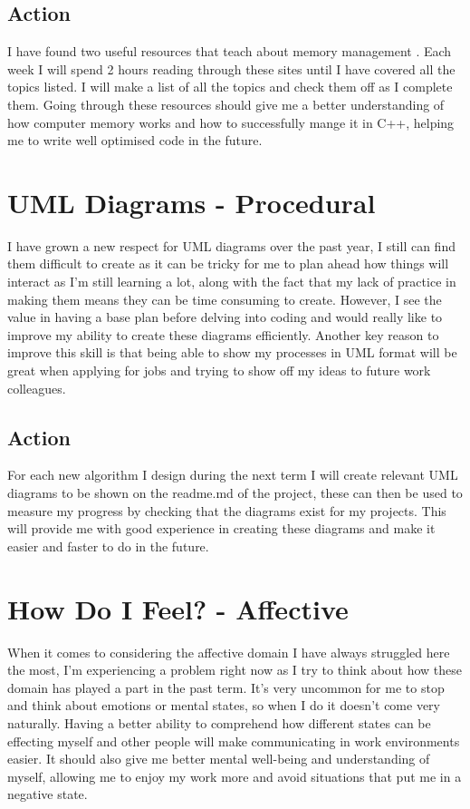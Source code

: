 \documentclass{scrartcl}
\begin{document}
\subsection{Action}
I have found two useful resources that teach about memory management \cite{c++programming/memorymanagement} \cite{whateveryprogrammershouldknowaboutmemory}. Each week I will spend 2 hours reading through these sites until I have covered all the topics listed. I will make a list of all the topics and check them off as I complete them. Going through these resources should give me a better understanding of how computer memory works and how to successfully mange it in C++, helping me to write well optimised code in the future.

\section{UML Diagrams - Procedural}
I have grown a new respect for UML diagrams over the past year, I still can find them difficult to create as it can be tricky for me to plan ahead how things will interact as I'm still learning a lot, along with the fact that my lack of practice in making them means they can be time consuming to create. However, I see the value in having a base plan before delving into coding and would really like to improve my ability to create these diagrams efficiently. Another key reason to improve this skill is that being able to show my processes in UML format will be great when applying for jobs and trying to show off my ideas to future work colleagues.
\subsection{Action}
For each new algorithm I design during the next term I will create relevant UML diagrams to be shown on the readme.md of the project, these can then be used to measure my progress by checking that the diagrams exist for my projects. This will provide me with good experience in creating these diagrams and make it easier and faster to do in the future.

\section{How Do I Feel? - Affective}
When it comes to considering the affective domain I have always struggled here the most, I'm experiencing a problem right now as I try to think about how these domain has played a part in the past term. It's very uncommon for me to stop and think about emotions or mental states, so when I do it doesn't come very naturally. Having a better ability to comprehend how different states can be effecting myself and other people will make communicating in work environments easier. It should also give me better mental well-being and understanding of myself, allowing me to enjoy my work more and avoid situations that put me in a negative state.
\end{document}
